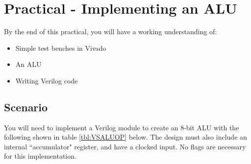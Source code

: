 \section{Practical - Implementing an ALU}
By the end of this practical, you will have a working understanding of:
\begin{itemize}
    \item Simple test benches in Vivado
    \item An ALU
    \item Writing Verilog code
\end{itemize}

\subsection{Scenario}
You will need to implement a Verilog module to create an 8-bit ALU with the following shown in table \ref{tbl:VSALUOP} below.
The design must also include an internal ``accumulator" register, and have a clocked input. No flags are necessary for this implementation.

